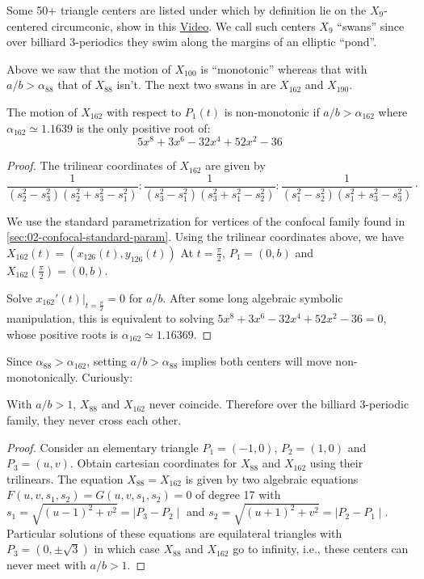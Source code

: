 Some 50+ triangle centers are listed under \cite[X(9)]{etc} which by definition lie on the $X_9$-centered circumconic, show in this \href{https://youtu.be/JdcJt5PExsw}{Video}. We call such centers $X_9$ ``swans'' since over billiard 3-periodics they swim along the margins of an elliptic ``pond''.

Above we saw that the motion of $X_{100}$ is ``monotonic'' whereas that with $a/b>\alpha_{88}$ that of $X_{88}$ isn't. The next two swans in \cite{etc} are $X_{162}$ and $X_{190}$. 

\begin{proposition}
\label{prop:05-x162}
The motion of $X_{162}$ with respect to $P_1(t)$ is non-monotonic if $a/b>\alpha_{162}$ where $\alpha_{162}{\simeq}1.1639$ is the only positive root of:
\[ 5 x^8 + 3 x^6 - 32 x^4 + 52 x^2 - 36 \]
\end{proposition}

\begin{proof}
The trilinear coordinates of $X_{162}$ are given by
{\small 
\[  \frac {1}{ \left( s_2^{2}-  s_3^{2} \right)  \left( s_2^{2}+ s_3^{2}-
s_1^{2} \right) } :  \frac {1}{ \left( s_3^{2}-  s_1^{2} \right)  \left( s_3^{2}+ s_1^{2} -
s_2^{2} \right) }:\frac {1}{ \left( s_1^{2}-  s_2^{2} \right)  \left( s_1^{2}+ s_3^{2} -
s_3^{2}\right) }\cdot
\]
}

We use the standard parametrization for vertices of the confocal family found in \cref{sec:02-confocal-standard-param}. Using the trilinear coordinates above, we have   $X_{162}(t)=(x_{126}(t), y_{126}(t))$ 
  At $t=\frac{\pi}{2}$, $P_1=(0,b)$ and   $X_{162}(\frac{\pi}{2})= (0,b)$.
  
  Solve $x_{162}'(t)|_{t=\frac{\pi}{2}}=0$ for $a/b$. After some long algebraic symbolic manipulation, this is equivalent to solving $5 x^8 + 3 x^6 - 32 x^4 + 52 x^2 - 36=0$, whose positive roots is $  \alpha_{162} \simeq 1.16369.$
\end{proof}

Since $\alpha_{88}>\alpha_{162}$, setting $a/b>\alpha_{88}$ implies both centers will move non-monotonically. Curiously:

\begin{proposition}
With $a/b>1$, $X_{88}$ and $X_{162}$ never coincide. Therefore over the billiard 3-periodic family, they never cross each other.
\end{proposition}

\begin{proof}
Consider an elementary triangle $P_1=(-1,0)$, $P_2=(1,0)$ and $P_3=(u,v)$. Obtain cartesian coordinates for $X_{88}$ and $X_{162}$ using their trilinears. The equation $X_{88}=X_{162}$ is given by two algebraic equations $F(u,v,s_1,s_2)=G(u,v,s_1,s_2)=0$ of degree 17 with   $s_1=\sqrt{(u-1)^2+v^2}=\mid P_3-P_2\mid$ and $s_2=\sqrt{(u+1)^2+v^2}=\mid P_2-P_1\mid$.
Particular solutions of these equations are    equilateral triangles with $P_3=(0,\pm \sqrt{3})$ in which case $X_{88}$ and $X_{162}$ go to infinity, i.e., these centers can never meet with $a/b>1$.
\end{proof}

